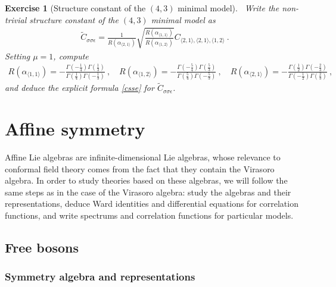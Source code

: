 \documentclass[12pt,a4paper,notitlepage]{report}
\numberwithin{equation}{section}
\theoremstyle{break}
\newtheorem{exo}{Exercise}[chapter]
\begin{document}
\begin{exo}[Structure constant of the $(4,3)$ minimal model]
 ~\label{exocsse}
Write the non-trivial structure constant of the $(4,3)$ minimal model as
\begin{align}
 \tilde{C}_{\sigma\sigma\epsilon} = \frac{1}{R(\alpha_{\langle 2,1 \rangle})}\sqrt{\frac{R(\alpha_{\langle 1,1 \rangle})}{R(\alpha_{\langle 1,2 \rangle})}} C_{\langle 2,1\rangle , \langle 2,1 \rangle,\langle 1,2 \rangle}\ .
\end{align}
Setting $\mu=1$, compute
\begin{align}
 R(\alpha_{\langle 1,1 \rangle}) = -\frac{\Gamma(-\frac14)\Gamma(\frac13)}{\Gamma(\frac14)\Gamma(-\frac13)} \ , \quad R(\alpha_{\langle 1,2 \rangle}) = -\frac{\Gamma(-\frac54)\Gamma(\frac53)}{\Gamma(\frac54)\Gamma(-\frac53)} \ , \quad R(\alpha_{\langle 2,1 \rangle}) = -\frac{\Gamma(\frac12)\Gamma(-\frac23)}{\Gamma(-\frac12)\Gamma(\frac23)}\ ,
\end{align}
and deduce the explicit formula \eqref{csse} for $\tilde{C}_{\sigma\sigma\epsilon}$.
\end{exo}


\chapter{Affine symmetry \label{secaff}}

Affine Lie algebras are infinite-dimensional Lie algebras, whose relevance to conformal field theory comes from the fact that they contain the Virasoro algebra.
In order to study theories based on these algebras, we will follow the same steps as in the case of the Virasoro algebra: study the algebras and their representations, deduce Ward identities and differential equations for correlation functions, and write spectrums and correlation functions for particular models. 

\section{Free bosons}

\subsection{Symmetry algebra and representations \label{secaua}}
\end{document}
